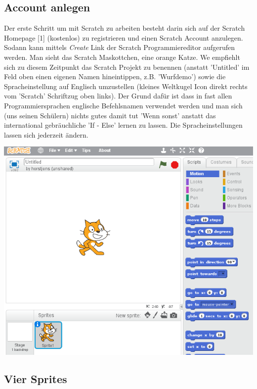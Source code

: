\documentclass[10pt,a4paper,ngerman,twoside]{article} %
\begin{document}
\begin{multicols}{3}
\subsection*{Account anlegen}

Der erste Schritt um mit Scratch zu arbeiten besteht darin sich auf der Scratch Homepage [1] (kostenlos) zu registrieren und einen Scratch Account anzulegen. Sodann kann mittels \textit{Create} Link der Scratch Programmiereditor aufgerufen werden. Man sieht das Scratch Maskottchen, eine orange Katze. We empfiehlt sich zu diesem Zeitpunkt das Scratch Projekt zu benennen (anstatt 'Untitled' im Feld oben einen eigenen Namen hineintippen, z.B. 'Wurfdemo') sowie die Spracheinstellung auf Englisch umzustellen (kleines Weltkugel Icon direkt rechts vom 'Scratch' Schriftzug oben links). Der Grund dafür ist dass in fast allen Programmiersprachen englische Befehlsnamen verwendet werden und man sich (uns seinen Schülern) nichts gutes damit tut 'Wenn sonst' anstatt das international gebräuchliche 'If - Else' lernen zu lassen. Die Spracheinstellungen lassen sich jederzeit ändern.

\begin{center}
\includegraphics[width=\linewidth]{scratch/fstart.png}
\end{center}

\subsection*{Vier Sprites}


\end{multicols}
\end{document}
